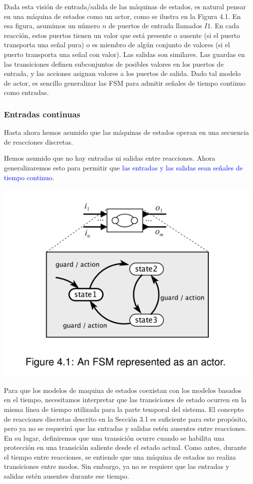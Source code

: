 Dada esta visión de entrada/salida de las máquinas de estados, es natural pensar en una máquina de estados como un actor, como se ilustra en la Figura 4.1. En esa figura, asumimos un número $n$ de puertos de entrada llamados $I1$. En cada reacción, estos puertos tienen un valor que está presente o ausente (si el puerto transporta una señal pura) o es miembro de algún conjunto de valores (si el puerto transporta una señal con valor). Las salidas son similares. Las guardas en las transiciones definen subconjuntos de posibles valores en los puertos de entrada, y las acciones asignan valores a los puertos de salida. Dado tal modelo de actor, es sencillo generalizar las FSM para admitir señales de tiempo continuo como entradas.


\subsubsection{Entradas continuas}


Hasta ahora hemos asumido que las máquinas de estados operan en una secuencia de reacciones discretas.

Hemos asumido que no hay entradas ni salidas entre reacciones. Ahora generalizaremos esto para permitir que 
\textcolor{blue}{
las entradas y las salidas sean señales de tiempo continuo.
}



    \includegraphics[width=0.5\linewidth]{4_4.1/fig4.png}
    
Para que los modelos de maquina de estados coexistan con los modelos basados en el tiempo, necesitamos interpretar que las transiciones de estado ocurren en la misma línea de tiempo utilizada para la parte temporal del sistema. El concepto de reacciones discretas descrito en la Sección 3.1 es suficiente para este propósito, pero ya no se requerirá que las entradas y salidas estén ausentes entre reacciones. En su lugar, definiremos que una transición ocurre cuando se habilita una protección en una transición saliente desde el estado actual. Como antes, durante el tiempo entre reacciones, se entiende que una máquina de estados no realiza transiciones entre modos. Sin embargo, ya no se requiere que las entradas y salidas estén ausentes durante ese tiempo.

